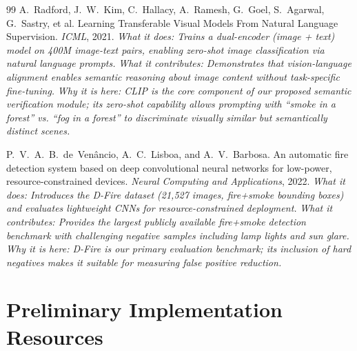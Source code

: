 \documentclass[11pt,twocolumn]{article}
\begin{document}
\begin{thebibliography}{99}
A.~Radford, J.~W.~Kim, C.~Hallacy, A.~Ramesh, G.~Goel, S.~Agarwal, G.~Sastry, et al.
\newblock Learning Transferable Visual Models From Natural Language Supervision.
\newblock \textit{ICML}, 2021.
\newblock \textit{What it does: Trains a dual-encoder (image + text) model on 400M image-text pairs, enabling zero-shot image classification via natural language prompts.}
\newblock \textit{What it contributes: Demonstrates that vision-language alignment enables semantic reasoning about image content without task-specific fine-tuning.}
\newblock \textit{Why it is here: CLIP is the core component of our proposed semantic verification module; its zero-shot capability allows prompting with ``smoke in a forest'' vs. ``fog in a forest'' to discriminate visually similar but semantically distinct scenes.}

P.~V.~A.~B.~de~Ven\^{a}ncio, A.~C.~Lisboa, and A.~V.~Barbosa.
\newblock An automatic fire detection system based on deep convolutional neural networks for low-power, resource-constrained devices.
\newblock \textit{Neural Computing and Applications}, 2022.
\newblock \textit{What it does: Introduces the D-Fire dataset (21,527 images, fire+smoke bounding boxes) and evaluates lightweight CNNs for resource-constrained deployment.}
\newblock \textit{What it contributes: Provides the largest publicly available fire+smoke detection benchmark with challenging negative samples including lamp lights and sun glare.}
\newblock \textit{Why it is here: D-Fire is our primary evaluation benchmark; its inclusion of hard negatives makes it suitable for measuring false positive reduction.}

\end{thebibliography}

\section{Preliminary Implementation Resources}
\label{sec:resources}
\end{document}
